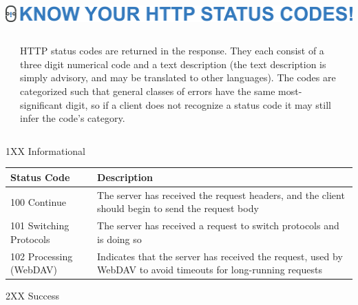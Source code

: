 \documentclass[final]{beamer}
\begin{document}
  \begin{frame}{}

    \begin{minipage}{\textwidth}
      \centering
      \includegraphics[]{./title-status-codes.png}
    \end{minipage}

    \vspace{0.5in}

    \begin{columns}
      \begin{column}{0.05\textwidth}
      \end{column}
      \begin{column}{0.9\textwidth}
        \begin{block}{}
          \large
            HTTP status codes are returned in the response. They each consist of
            a three digit numerical code and a text description (the text
            description is simply advisory, and may be translated to other
            languages). The codes are categorized such that general classes of
            errors have the same most-significant digit, so if a client does not
            recognize a status code it may still infer the code's category.
          \normalsize
        \end{block}
      \end{column}
      \begin{column}{0.05\textwidth}
      \end{column}
    \end{columns}

    \vspace{0.5in}

    \begin{block}{\huge 1XX Informational}

      \vspace{0.3in}

      \begin{tabular}{p{} p{}}
        Status Code & Description \\ \hline
        100 Continue & The server has received the request headers, and the client should begin to send the request body \\
        101 Switching Protocols & The server has received a request to switch protocols and is doing so \\
        102 Processing (WebDAV) & Indicates that the server has received the request, used by WebDAV to avoid timeouts for long-running requests \\
      \end{tabular}
    \end{block}
    \begin{block}{\huge 2XX Success}


\end{block}
\end{frame}
\end{document}
